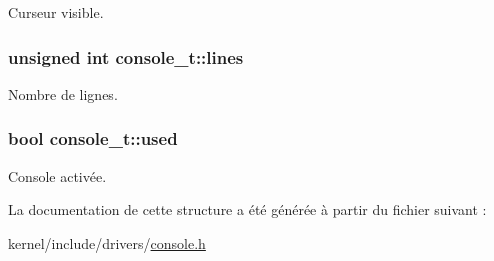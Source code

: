 Curseur visible. \hypertarget{structconsole__t_ada36635a93afd23c3eb88c856f218103}{
\subsubsection[{lines}]{\setlength{\rightskip}{0pt plus 5cm}unsigned int console\-\_\-t\-::lines}}\label{structconsole__t_ada36635a93afd23c3eb88c856f218103}
Nombre de lignes. \hypertarget{structconsole__t_ad830edd689dced40135f6afa651677e3}{
\subsubsection[{used}]{\setlength{\rightskip}{0pt plus 5cm}bool console\-\_\-t\-::used}}\label{structconsole__t_ad830edd689dced40135f6afa651677e3}
Console activée. 

La documentation de cette structure a été générée à partir du fichier suivant \-:\begin{DoxyCompactItemize}
\item 
kernel/include/drivers/\hyperlink{console_8h}{console.\-h}\end{DoxyCompactItemize}
